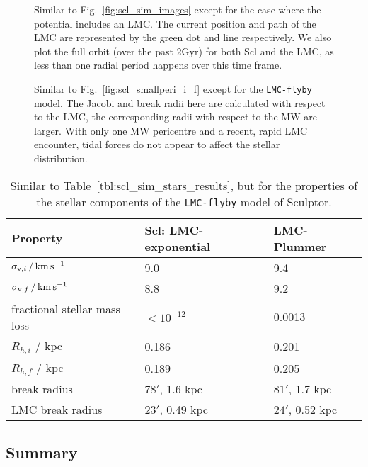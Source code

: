 \begin{figure}
\centering
{}
\caption[Sculptor simulation snapshots with LMC]{Similar to
Fig.~\ref{fig:scl_sim_images} except for the case where the potential
includes an LMC. The current position and path of the LMC are
represented by the green dot and line respectively. We also plot the
full orbit (over the past 2Gyr) for both Scl and the LMC, as less than
one radial period happens over this time
frame.}\label{fig:scl_lmc_sim_images}
\end{figure}

\begin{figure}
\centering
{}
\caption[Sculptor initial and final density with LMC]{Similar to
Fig.~\ref{fig:scl_smallperi_i_f} except for the \texttt{LMC-flyby}
model. The Jacobi and break radii here are calculated with respect to
the LMC, the corresponding radii with respect to the MW are larger. With
only one MW pericentre and a recent, rapid LMC encounter, tidal forces
do not appear to affect the stellar
distribution.}\label{fig:scl_lmc_i_f}
\end{figure}

\begin{table*}[t]
\centering
\caption[Simulation results for Sculptor’s stars in the LMC+MW potential]{Similar to Table \ref{tbl:scl_sim_stars_results}, but for the properties of the stellar components of the \texttt{LMC-flyby} model of Sculptor. }
\label{tbl:scl_lmc_sim_stars}
\begin{tabular}{lll}
\toprule
Property & Scl: LMC-exponential & LMC-Plummer\\
\midrule
$\sigma_{{\rm v}, i}\,/\,{\rm km\,s^{-1}}$ & 9.0 & 9.4\\
$\sigma_{{\rm v}, f} \,/\,{\rm km\,s^{-1}}$ & 8.8 & 9.2\\
fractional stellar mass loss & $<10^{-12}$ & 0.0013\\
$R_{h, i}$ / kpc & 0.186 & 0.201\\
$R_{h, f}$ / kpc & 0.189 & 0.205\\
break radius & $78'$, 1.6 kpc & $81'$, 1.7 kpc\\
LMC break radius & $23'$, 0.49 kpc & $24'$, 0.52 kpc\\
\bottomrule
\end{tabular}
\end{table*}

\subsection{Summary}\label{summary}

